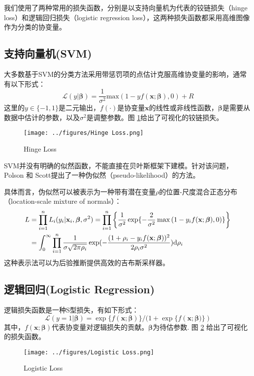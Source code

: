 \documentclass[AutoFakeBold]{LZUThesis}
\newcommand{\scite}[1]{\textsuperscript{\cite{#1}}}
\begin{document}
我们使用了两种常用的损失函数，分别是以支持向量机为代表的铰链损失（hinge loss）和逻辑回归损失（logistic regression loss），这两种损失函数都采用高维图像作为分类的协变量。

\subsection{支持向量机(SVM)}
大多数基于SVM的分类方法采用带惩罚项的点估计克服高维协变量的影响，通常有以下形式：
\begin{equation}
	\mathcal{L}(y|\boldsymbol{\beta}) = \dfrac{1}{\sigma^{2}}\text{max}(1-yf(\mathbf{x};\boldsymbol{\beta}),0) + R
	\label{Equation:Hinge Loss}
\end{equation}
这里的$y\in\{-1,1\}$是二元输出，$f(\cdot)$是协变量$\mathbf{x}$的线性或非线性函数，$\boldsymbol{\beta}$是需要从数据中估计的参数，以及$\sigma^{2}$是调整参数。图 \ref{Fig:Hinge Loss}给出了可视化的铰链损失。
\begin{figure}[h]
	\small
	\centering
	\texttt{[image: ../figures/Hinge Loss.png]}
	\caption{Hinge Loss
	}
	\label{Fig:Hinge Loss}
\end{figure}
SVM并没有明确的似然函数，不能直接在贝叶斯框架下建模。针对该问题，Polson 和 Scott提出了一种伪似然（pseudo-likelihood）的方法\scite{polson2011data}。

具体而言，伪似然可以被表示为一种带有潜在变量$\rho$的位置-尺度混合正态分布（location-scale mixture of normals）：
\begin{align}
	L &= \prod_{i=1}^{n} L_{i}(y_{i}|\mathbf{x}_{i}, \boldsymbol{\beta}, \sigma^{2}) \notag 
	= \prod_{i=1}^{n} \left\{ \dfrac{1}{\sigma^{2}} \exp\{-\dfrac{2}{\sigma^{2}} \max\left(1 - y_{i} f(\mathbf{x}; \boldsymbol{\beta}), 0 \right)\} \right\}\notag \\
	&= \int_{0}^{\infty}\prod_{i=1}^{n}\dfrac{1}{\sigma\sqrt{2\pi\rho_{i}}}\exp(-\dfrac{(1+\rho_{i} - y_{i}f(\mathbf{x};\boldsymbol{\beta}))^{2}}{2\rho_{i}\sigma^{2}})\text{d}\rho_{i}
	\label{Equation:pseudo-likelihood}
\end{align}
这种表示法可以为后验推断提供高效的吉布斯采样器。
\subsection{逻辑回归(Logistic Regression)}
逻辑损失函数是一种S型损失，有如下形式：
\begin{equation}
	\mathcal{L}(y=1|\boldsymbol{\beta}) = \exp\{f(\mathbf{x};\boldsymbol{\beta})\}/(1+\exp\{f(\mathbf{x};\boldsymbol{\beta)}\})
\end{equation}
其中，$f(\mathbf{x};\boldsymbol{\beta})$代表协变量对逻辑损失的贡献。$\boldsymbol{\beta}$为待估参数. 图 \ref{Fig:Logistic Loss} 给出了可视化的损失函数。
\begin{figure}[h]
	\small
	\centering
	\texttt{[image: ../figures/Logistic Loss.png]}
	\caption{Logistic Loss
	}
	\label{Fig:Logistic Loss}
\end{figure}
\end{document}
